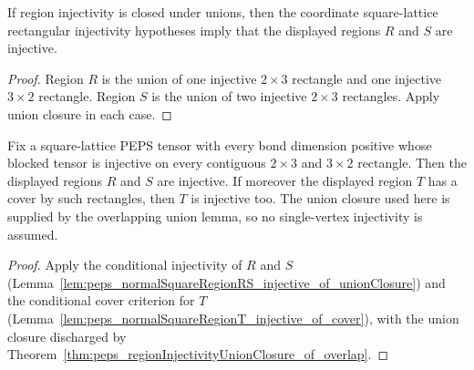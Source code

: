 \begin{lemma}%
    \label{lem:peps_normalSquareRegionRS_injective_of_unionClosure}
    \leanok
    If region injectivity is closed under unions, then the coordinate
    square-lattice rectangular injectivity hypotheses imply that the displayed
    regions $R$ and $S$ are injective.
\end{lemma}
\begin{proof}\leanok
    Region $R$ is the union of one injective $2\times3$ rectangle and one
    injective $3\times2$ rectangle. Region $S$ is the union of two
    injective $2\times3$ rectangles. Apply union closure in each case.
\end{proof}

\begin{lemma}%
    \label{lem:peps_normalSquareRegionRST_injective}
    \leanok
    Fix a square-lattice PEPS tensor with every bond dimension positive whose
    blocked tensor is injective on every contiguous $2\times3$ and $3\times2$
    rectangle. Then the displayed regions $R$ and $S$ are injective. If
    moreover the displayed region $T$ has a cover by such rectangles, then $T$
    is injective too. The union closure used here is supplied by the
    overlapping union lemma, so no single-vertex injectivity is assumed.
\end{lemma}
\begin{proof}\leanok
    Apply the conditional injectivity of $R$ and $S$
    (Lemma~\ref{lem:peps_normalSquareRegionRS_injective_of_unionClosure}) and the
    conditional cover criterion for $T$
    (Lemma~\ref{lem:peps_normalSquareRegionT_injective_of_cover}), with the union
    closure discharged by
    Theorem~\ref{thm:peps_regionInjectivityUnionClosure_of_overlap}.
\end{proof}

